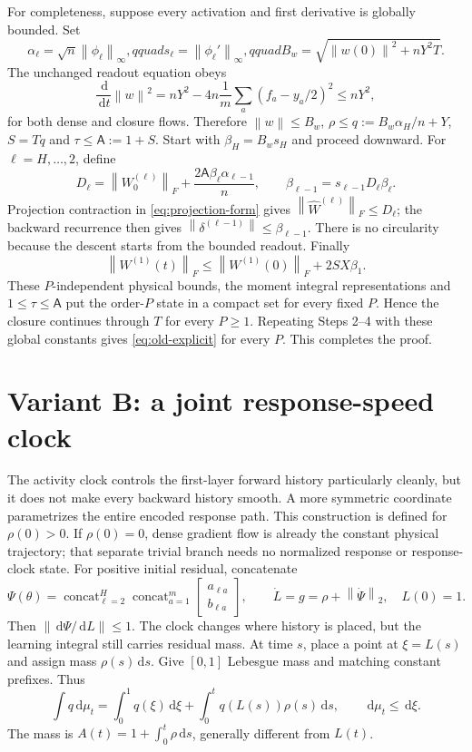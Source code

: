 \documentclass[11pt]{article}
\theoremstyle{definition}
\theoremstyle{remark}
\newcommand{\norm}[1]{\left\lVert #1\right\rVert}
\newcommand{\dd}{\,\mathrm{d}}
\begin{document}
For completeness, suppose every activation and first derivative is globally
bounded.  Set
\[
 \alpha_\ell=\sqrt n\norm{\phi_\ell}_\infty,qquad
 s_\ell=\norm{\phi_\ell'}_\infty,qquad
 B_w=\sqrt{\norm{w(0)}^2+nY^2T}.
\]
The unchanged readout equation obeys
\[
 \frac{\dd}{\dd t}\norm w^2
 =nY^2-4n\frac1m\sum_a(f_a-y_a/2)^2\le nY^2,
\]
for both dense and closure flows.  Therefore
$\norm w\le B_w$, $\rho\le q:=B_w\alpha_H/n+Y$,
$S=Tq$ and $\tau\le\mathsf A:=1+S$.  Start with
$\beta_H=B_ws_H$ and proceed downward.  For $\ell=H,\ldots,2$, define
\[
 D_\ell=\norm{W_0^{(\ell)}}_F+
 \frac{2\mathsf A\beta_\ell\alpha_{\ell-1}}{n},
 \qquad \beta_{\ell-1}=s_{\ell-1}D_\ell\beta_\ell.
\]
Projection contraction in \eqref{eq:projection-form} gives
$\norm{\widehat W^{(\ell)}}_F\le D_\ell$; the backward recurrence then gives
$\norm{\delta^{(\ell-1)}}\le\beta_{\ell-1}$.  There is no circularity because
the descent starts from the bounded readout.  Finally
\[
 \norm{W^{(1)}(t)}_F\le\norm{W^{(1)}(0)}_F+2SX\beta_1.
\]
These $P$-independent physical bounds, the moment integral representations and
$1\le\tau\le\mathsf A$ put the order-$P$ state in a compact set for every
fixed $P$.  Hence the closure continues through $T$ for every $P\ge1$.
Repeating Steps 2--4 with these global constants gives
\eqref{eq:old-explicit} for every $P$.  This completes the proof.

\section{Variant B: a joint response-speed clock}
\label{sec:new-clock}

The activity clock controls the first-layer forward history particularly
cleanly, but it does not make every backward history smooth.  A more symmetric
coordinate parametrizes the entire encoded response path.  This construction
is defined for $\rho(0)>0$.  If $\rho(0)=0$, dense gradient flow is already the
constant physical trajectory; that separate trivial branch needs no normalized
response or response-clock state.  For positive initial residual, concatenate
\begin{equation}
 \Psi(\theta)=\operatorname{concat}_{\ell=2}^{H}
 \operatorname{concat}_{a=1}^{m}
 \begin{bmatrix}a_{\ell a}\\ b_{\ell a}\end{bmatrix},\qquad
 \dot L=g=\rho+\norm{\dot\Psi}_2,\quad L(0)=1.        \label{eq:new-clock}
\end{equation}
Then $\norm{\dd\Psi/\dd L}\le1$.  The clock changes where history is placed,
but the learning integral still carries residual mass.  At time $s$, place a
point at $\xi=L(s)$ and assign mass $\rho(s)\dd s$.  Give $[0,1]$ Lebesgue
mass and matching constant prefixes.  Thus
\[
 \int q\dd\mu_t=\int_0^1q(\xi)\dd\xi+
 \int_0^tq(L(s))\rho(s)\dd s,\qquad \dd\mu_t\le\dd\xi.
\]
The mass is $A(t)=1+\int_0^t\rho\dd s$, generally different from $L(t)$.
\end{document}

